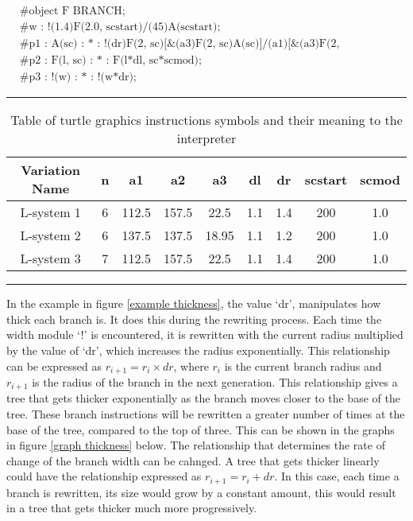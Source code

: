 \begin{singlespace}
\begin{equation}
\begin{aligned}
	&\textrm{\#object F BRANCH;}\\
	&\textrm{\#w : !(1.4)F(2.0, scstart)/(45)A(scstart);}\\
	&\textrm{\#p1 : A(sc) : * : !(dr)F(2, sc)[\&(a3)F(2, sc)A(sc)]/(a1)[\&(a3)F(2, sc)A(sc)]/(a2)[\&(a3)F(2, sc)A(sc)];}\\
	&\textrm{\#p2 : F(l, sc) : * : F(l*dl, sc*scmod);}\\
	&\textrm{\#p3 : !(w) : * : !(w*dr);}
\end{aligned}
\end{equation} \label{parametric L-system results}
\end{singlespace}

\vspace{10mm}
\hrule
\begin{table}[h!]
\centering
\begin{tabular}{ | c | c | c | c | c | c | c | c | c | }
\hline
	Variation Name & n & a1 & a2 & a3 & dl & dr & scstart & scmod\\  
\hline
\hline
	L-system 1  & 6 & 112.5 & 157.5 & 22.5 & 1.1 & 1.4 & 200 & 1.0 \\
\hline
	L-system 2  & 6 & 137.5 & 137.5 & 18.95 & 1.1 & 1.2 & 200 & 1.0 \\
\hline
	L-system 3  & 7 & 112.5 & 157.5 & 22.5 & 1.1 & 1.4 & 200 & 1.0 \\
\hline
\end{tabular}
\caption{Table of turtle graphics instructions symbols and their meaning to the interpreter}
\label{L-system params}
\end{table}
\FloatBarrier
\hrule

\vspace{10mm} 

\noindent
In the example in figure \ref{example thickness}, the value `dr', manipulates how thick each branch is. It does this during the rewriting process. Each time the width module `!' is encountered, it is rewritten with the current radius multiplied by the value of `dr', which increases the radius exponentially. This relationship can be expressed as $r_{i+1} = r_i \times dr$, where $r_i$ is the current branch radius and $r_{i+1}$ is the radius of the branch in the next generation. This relationship gives a tree that gets thicker exponentially as the branch moves closer to the base of the tree. These branch instructions will be rewritten a greater number of times at the base of the tree, compared to the top of three. This can be shown in the graphs in figure \ref{graph thickness} below. The relationship that determines the rate of change of the branch width can be cahnged. A tree that gets thicker linearly could have the relationship expressed as $r_{i+1} = r_i + dr$. In this case, each time a branch is rewritten, its size would grow by a constant amount, this would result in a tree that gets thicker much more progressively.

